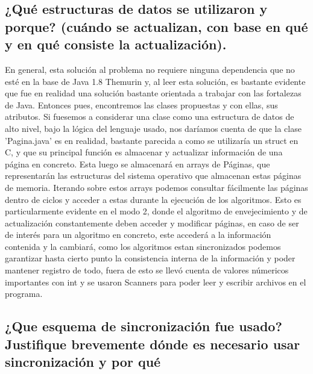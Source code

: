 \documentclass[a4paper]{article}
\begin{document}
\subsection{¿Qué estructuras de datos se utilizaron y porque? (cuándo se actualizan, con base en qué y en qué consiste la actualización). }
En general, esta solución al problema no requiere ninguna dependencia que
no esté en la base de Java 1.8 Themurin y, al leer esta solución, es
bastante evidente que fue en realidad una solución bastante orientada a
trabajar con las fortalezas de Java. Entonces pues, encontremos las clases
propuestas y con ellas, sus atributos. Si fuesemos a considerar una clase
como una estructura de datos de alto nivel, bajo la lógica del lenguaje usado,
nos daríamos cuenta de que la clase 'Pagina.java' es en realidad, bastante
parecida a como se utilizaría un struct en C, y que su principal función es
almacenar y actualizar información de una página en concreto. Esta luego se
almacenará en arrays de Páginas, que representarán las estructuras del sistema
operativo que almacenan estas páginas de memoria. Iterando sobre estos arrays
podemos consultar fácilmente las páginas dentro de ciclos y acceder a estas
durante la ejecución de los algoritmos. Esto es particularmente evidente en
el modo 2, donde el algoritmo de envejecimiento y de actualización constantemente
deben acceder y modificar páginas, en caso de ser de interés para un algoritmo
en concreto, este accederá a la información contenida y la cambiará, como los
algoritmos estan sincronizados podemos garantizar hasta cierto punto la 
consistencia interna de la información y poder mantener registro de todo,
fuera de esto se llevó cuenta de valores númericos importantes con int y se
usaron Scanners para poder leer y escribir archivos en el programa.  

\subsection{¿Que esquema de sincronización fue usado? Justifique brevemente dónde es necesario usar sincronización y por qué}
\end{document}
